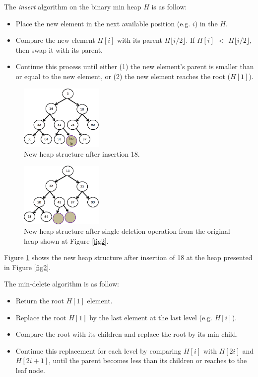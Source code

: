 \documentclass[10pt, conference, compsocconf]{IEEEtran}
\begin{document}
The {\it insert} algorithm on the binary min heap $H$ is as follow:
\begin{itemize}
\item Place the new element in the next available position (e.g. $i$) in the $H$.
\item Compare the new element $H[i]$ with its parent $H\lfloor i/2 \rfloor$. If $H[i]$ $<$ $H\lfloor i/2 \rfloor$, then swap it with its parent.
\item Continue this process until either (1) the new element’s parent is smaller than or
equal to the new element, or (2) the new element reaches the root ($H[1]$).
\end{itemize}

\begin{figure}[!ht]
  \centering
  \includegraphics[width=4cm]{Figures/fig3.png}
      \caption{New heap structure after insertion 18.}
    \label{fig3}
\end{figure}

\begin{figure}[!ht]
  \centering
  \includegraphics[width=4cm]{Figures/fig4.png}
      \caption{New heap structure after single deletion operation from the original heap shown at Figure \ref{fig2}.}
    \label{fig4}
\end{figure}

Figure \ref{fig3} shows the new heap structure after insertion of 18 at the heap presented in Figure \ref{fig2}.

The min-delete algorithm is as follow:
\begin{itemize}
\item Return the root $H[1]$ element.
\item Replace the root $H[1]$ by the last element at the last level (e.g. $H[i]$).
\item Compare the root with its children and replace the root by its min child.
\item Continue this replacement for each level by comparing $H[i]$ with $H[2i]$ and $H[2i+1]$, until the parent becomes less than its children or reaches to the leaf node.
\end{itemize}
\end{document}
